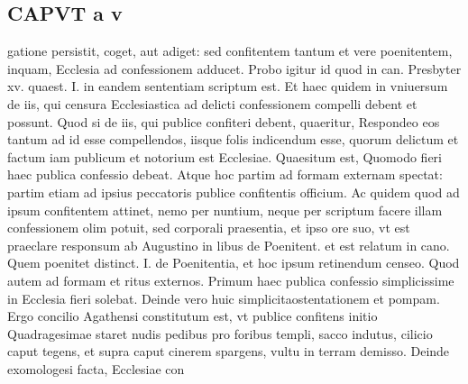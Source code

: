 \documentclass{article}
\begin{document}
\begin{pages}
\section*{CAPVT a v }
\marginpar{[ p.323 ]}\pstart gatione persistit, coget, aut adiget: sed confitentem tantum et vere poenitentem, inquam, Ecclesia ad confessionem adducet. Probo igitur id quod in can. Presbyter xv. quaest. I. in eandem sententiam scriptum est. Et haec quidem in vniuersum de iis, qui censura Ecclesiastica ad delicti confessionem compelli debent et possunt. Quod si de iis, qui publice confiteri debent, quaeritur, Respondeo eos tantum ad id esse compellendos, iisque folis indicendum esse, quorum delictum et factum iam publicum et notorium est Ecclesiae. Quaesitum est, Quomodo fieri haec publica confessio debeat. Atque hoc partim ad formam externam spectat: partim etiam ad ipsius peccatoris publice confitentis officium. Ac quidem quod ad ipsum confitentem attinet, nemo per nuntium, neque per scriptum facere illam confessionem olim potuit, sed corporali praesentia, et ipso ore suo, vt est praeclare responsum ab Augustino in libus  de Poenitent. et est relatum in cano. Quem poenitet distinct. I. de Poenitentia, et hoc ipsum retinendum censeo. Quod autem ad formam et ritus externos. Primum haec publica confessio simplicissime in Ecclesia fieri solebat. Deinde vero huic simplicitaostentationem et pompam. Ergo concilio Agathensi constitutum est, vt publice confitens initio Quadragesimae staret nudis pedibus pro foribus templi, sacco indutus, cilicio caput tegens, et supra caput cinerem spargens, vultu in terram demisso. Deinde exomologesi facta, Ecclesiae con\pend

\end{pages}
\end{document}
